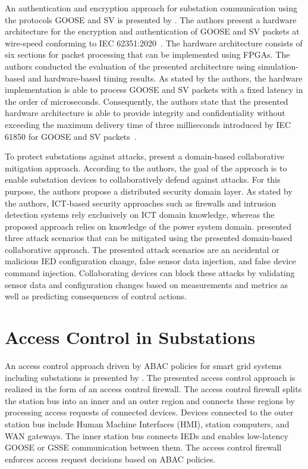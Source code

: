 An authentication and encryption approach for substation communication using the protocols GOOSE and SV is presented by \citeauthor{Rodriguez2021} \cite{Rodriguez2021}.
The authors present a hardware architecture for the encryption and authentication of GOOSE and SV packets at wire-speed conforming to IEC 62351:2020~\cite{IEC62351P6}.
The hardware architecture consists of six sections for packet processing that can be implemented using FPGAs.
The authors conducted the evaluation of the presented architecture using simulation-based and hardware-based timing results.
As stated by the authors, the hardware implementation is able to process GOOSE and SV packets with a fixed latency in the order of microseconds.
Consequently, the authors state that the presented hardware architecture is able to provide integrity and confidentiality without exceeding the maximum delivery time of three milliseconds introduced by IEC 61850 for GOOSE and SV packets~\cite{IEC61850P5}.

To protect substations against attacks, \citeauthor{Hong2019} present a domain-based collaborative mitigation approach.
According to the authors, the goal of the approach is to enable substation devices to collaboratively defend against attacks.
For this purpose, the authors propose a distributed security domain layer.
As stated by the authors, ICT-based security approaches such as firewalls and intrusion detection systems rely exclusively on ICT domain knowledge, whereas the proposed approach relies on knowledge of the power system domain.
\citeauthor{Hong2019} presented three attack scenarios that can be mitigated using the presented domain-based collaborative approach.
The presented attack scenarios are an accidental or malicious IED configuration change, false sensor data injection, and false device command injection.
Collaborating devices can block these attacks by validating sensor data and configuration changes based on measurements and metrics as well as predicting consequences of control actions.

\section{Access Control in Substations}
An access control approach driven by ABAC policies for smart grid systems including substations is presented by \citeauthor{Ruland2018} \cite{Ruland2018}.
The presented access control approach is realized in the form of an access control firewall.
The access control firewall splits the station bus into an inner and an outer region and connects these regions by processing access requests of connected devices.
Devices connected to the outer station bus include Human Machine Interfaces (HMI), station computers, and WAN gateways.
The inner station bus connects IEDs and enables low-latency GOOSE or GSSE communication between them.
The access control firewall enforces access request decisions based on ABAC policies.

